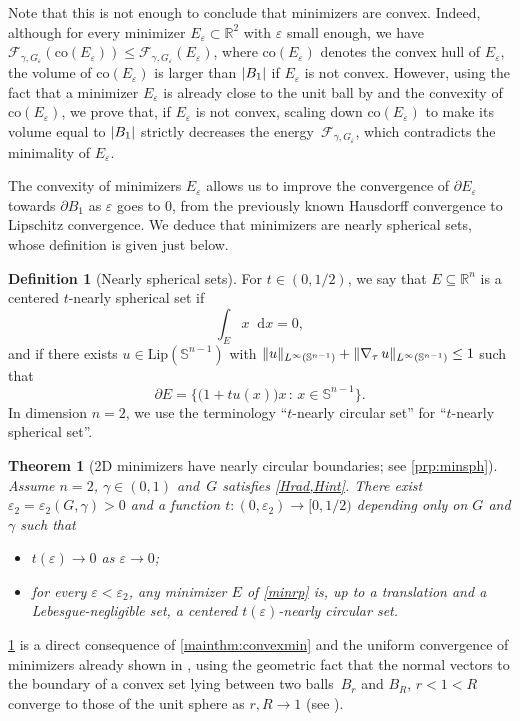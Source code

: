 \documentclass[JEP,XML,SOM,Unicode,published]{cedram}
\newcommand{\sep}{\,:\,}
\newcommand{\enquote}[1]{``#1''}
\numberwithin{equation}{section}
\theoremstyle{plain}
\newtheorem{mainthm}{Theorem}
\theoremstyle{definition}
\newtheorem{maindfn}{Definition}
\newcommand{\numberset}[1]{{\mathbb{#1}}}
\newcommand{\R}{\numberset{R}}
\newcommand{\dx}{\mathop{}\mathopen{}\mathrm{d}x}
\newcommand{\bbS}{\mathbb{S}}
\newcommand{\calF}{{\mathcal{F}}}
\let\eps\varepsilon
\newcommand{\co}{{\mathrm{co}}}
\newcommand{\Ren}{{\R^n}}
\newcommand{\Lip}{{\mathrm{Lip}}}
\newcommand{\grad}{\nabla}
\newcommand{\subsq}{\subseteq}
\DeclarePairedDelimiter{\abs}{\lvert}{\rvert}
\DeclarePairedDelimiter{\norm}{\lVert}{\rVert}
\begin{document}
Note that this is not enough to conclude that minimizers are convex. Indeed, although for every
minimizer $E_\eps\subset\R^2$ with $\eps$ small enough, we have
$\calF_{\gamma,G_\eps}(\co(E_\eps))\leq\calF_{\gamma,G_\eps}(E_\eps)$, where $\co(E_\eps)$ denotes
the convex hull of $E_\eps$, the volume of $\co(E_\eps)$ is larger than $\abs{B_1}$ if $E_\eps$ is
not convex. However, using the fact that a minimizer $E_\eps$ is already close to the unit ball by
\cite{Peg2021} and the convexity of $\co(E_\eps)$, we prove that, if $E_\eps$ is not convex,
scaling down $\co(E_\eps)$ to make its volume equal to $\abs{B_1}$ strictly
decreases the energy~$\calF_{\gamma,G_\eps}$, which contradicts the minimality of $E_\eps$.

The convexity of minimizers $E_\eps$ allows us to improve the convergence of $\partial E_\eps$
towards $\partial B_1$ as $\eps$ goes to $0$, from the previously known Hausdorff convergence to
Lipschitz convergence. We deduce that minimizers are nearly spherical sets, whose definition is
given just below.

\begin{maindfn}[Nearly spherical sets]\label{maindfn:nearlysph}
For $t\in (0,1/2)$, we say that $E\subsq\Ren$ is a centered $t$-nearly spherical set if
\[
\int_E x\dx=0,
\]
and if there exists $u\in \Lip(\bbS^{n-1})$ with $\norm{u}_{L^\infty(\bbS^{n-1})}+\norm{\grad_\tau\,
u}_{L^\infty(\bbS^{n-1})}\leq 1$ such that
\[
\partial E=\bigl\{ \big(1+tu(x)\big)x\sep  x\in\bbS^{n-1}\bigl\}.
\]
In dimension $n=2$, we use the terminology \enquote{$t$-nearly circular set} for \enquote{$t$-nearly
spherical set}.
\end{maindfn}

\begin{mainthm}[2D minimizers have nearly circular boundaries; see
{\cref{prp:minsph}}]\label{mainthm:minnearlycirc}
Assume $n=2$, $\gamma\in(0,1)$ and~$G$ satisfies \cref{Hrad,Hint}. There exist
$\eps_2=\eps_2(G,\gamma)>0$ and a function $t:(0,\eps_2)\to [0,1/2)$ depending only on $G$
and $\gamma$ such that
\begin{itemize}
\item $t(\eps)\to 0$ as $\eps\to 0$;
\item for every $\eps<\eps_2$, any minimizer $E$ of \cref{minrp} is, up to a translation and a
Lebesgue-negligible set, a centered $t(\eps)$-nearly circular set.
\end{itemize}
\end{mainthm}

\cref{mainthm:minnearlycirc} is a direct consequence of \cref{mainthm:convexmin} and the uniform
convergence of minimizers already shown in \cite{Peg2021}, using the geometric fact that the
normal vectors to the boundary of a convex set lying between two balls~$B_r$ and $B_R$, $r< 1< R$
converge to those of the unit sphere as $r,R\to 1$ (see \cite{Oss1987,Fug1989}).
\end{document}
